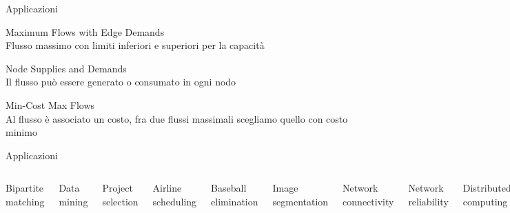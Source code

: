 \begin{frame}{Applicazioni}

\BIL
\item  \alert{Maximum Flows with Edge Demands}\\
Flusso massimo con limiti inferiori e superiori per la capacità

\item \alert{Node Supplies and Demands}\\
Il flusso può essere generato o consumato in ogni nodo

\item \alert{Min-Cost Max Flows}\\
Al flusso è associato un costo, fra due flussi massimali scegliamo quello con costo minimo

\EIL
\medskip
{}


\end{frame}


\begin{frame}{Applicazioni}

\vspace{-9pt}
\begin{columns}[T]
\BIL
\item Bipartite matching
\item Data mining
\item Project selection
\item Airline scheduling
\item Baseball elimination
\item Image segmentation
\item Network connectivity
\EIL
{}
\BIL
\item Network reliability
\item Distributed computing
\item Egalitarian stable matching
\item Security of statistical data
\item Network intrusion detection
\item Multi-camera scene reconstruction
\item Gene function prediction
\EIL
\end{columns}

\medskip
{}


\end{frame}

